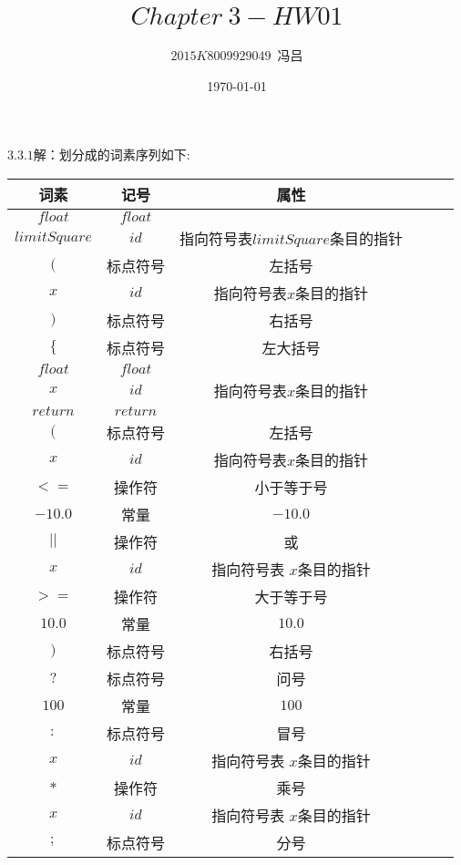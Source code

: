 \documentclass[UTF8,noindent]{ctexart}
\title{$Chapter\ 3-HW01$}
\author{$2015K8009929049$\ 冯吕}
\date{\today}
\begin{document}
\maketitle
{}
$3.3.1$解：划分成的词素序列如下:
\begin{center}
  \begin{tabular}{|c|c|c|c|c|c|}
	\hline
	词素&记号&属性\\
	\hline
    $float$&$float$& \\
	\hline
	$limitSquare$&$id$&指向符号表$limitSquare$条目的指针\\
	\hline
	$($ & 标点符号&左括号\\
	  \hline
	  $x$ & $id$ & 指向符号表$x$条目的指针\\
	  \hline
	$)$ & 标点符号 & 右括号\\
	\hline
	$\{$ & 标点符号& 左大括号\\
	  \hline 
	  $float$ & $float$ &\\
	  \hline 
	  $x$ & $id$ & 指向符号表$x$条目的指针\\
	  \hline
	  $return$ & $return$ & \\
	  \hline 
	  $($ & 标点符号 & 左括号\\
		\hline
		$x$ & $id$ & 指向符号表$x$条目的指针\\
		\hline
		$<=$ & 操作符 &小于等于号\\
		\hline 
		$-10.0$ & 常量 & $-10.0$ \\
		\hline 
		$||$ & 操作符 & 或\\
		\hline
		$x$ & $id$ & 指向符号表 $x$条目的指针\\
		\hline
		$>=$ &操作符 &大于等于号\\
		\hline
		$10.0$ & 常量 & $10.0$\\
		\hline 
	  $)$ & 标点符号 & 右括号\\
	  \hline 
	  $?$ & 标点符号 & 问号 \\
	  \hline 
	  $100$& 常量 & $100$ \\
	  \hline 
	  $:$ & 标点符号 & 冒号\\
	  \hline 
		$x$ & $id$ & 指向符号表 $x$条目的指针\\
		\hline 
	  $*$ & 操作符 & 乘号\\
	  \hline
		$x$ & $id$ & 指向符号表 $x$条目的指针\\
		\hline
	  $;$ & 标点符号 & 分号\\
	  \hline 
  \end{tabular}
\end{center}
\end{document}
